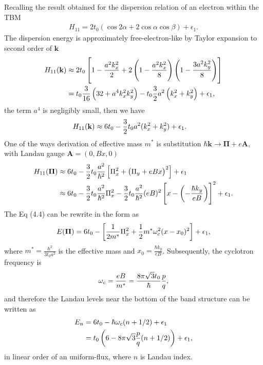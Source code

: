Recalling the result obtained for the dispersion relation of an electron within the \ac{TBM}
\begin{gather}
H_{11} = 2 t_{0} (\cos 2\alpha + 2 \cos \alpha \cos \beta) + \epsilon_{1}.
\end{gather}
The dispersion energy is approximately free-electron-like by Taylor expansion to second order of $\mathbf{k}$
\begin{equation}
\begin{aligned}
	H_{11}(\mathbf{k})
	& \approx 2 t_{0} \left[1 - \frac{a^{2} k_{x}^{2}}{2} + 2\left(1 - \dfrac{a^{2} k_{x}^{2}}{8}\right)\left(1 - \dfrac{3a^{2} k_{y}^{2}}{8}\right)\right] \\
	& = t_{0} \dfrac{3}{16} \left(32 + a^{4} k_{x}^{2} k_{y}^{2}\right) - t_{0} \dfrac{3}{2} a^{2}\left(k_{x}^{2} + k_{y}^{2}\right) + \epsilon_{1} ,
\end{aligned}
\end{equation}
the term $a^{4}$ is negligibly small, then we have
\begin{equation}
\begin{aligned}
	H_{11}(\mathbf{k})
	& \approx 6 t_{0} - \dfrac{3}{2} t_{0} a^{2} (k_{x}^{2} + k_{y}^{2}) + \epsilon_{1}.
\end{aligned}
\end{equation}
One of the ways derivation of effective mass $m^{*}$ is substitution $\hbar\mathbf{k} \rightarrow \mathbf{\Pi} + e \mathbf{A}$, with Landau gauge $\mathbf{A} = (0,Bx,0)$
\begin{equation}
\begin{aligned}
	H_{11}(\mathbf{\Pi})
	& \approx 6 t_{0} - \dfrac{3}{2} t_{0} \dfrac{a^{2}}{\hbar^{2}} \left[ \Pi_{x}^{2} + \left(\Pi_{y} + e B x\right)^{2}\right] + \epsilon_{1}                                                           \\
	& \approx 6 t_{0} - \dfrac{3}{2} t_{0} \dfrac{a^{2}}{\hbar^{2}} \Pi_{x}^{2} - \dfrac{3}{2} t_{0} \dfrac{a^{2}}{\hbar^{2}} (e B)^{2} \left[ x - \left(- \dfrac{\hbar k_{y}}{eB}\right) \right]^{2} + \epsilon_{1}.
\end{aligned}
\end{equation}
The Eq (4.4) can be rewrite in the form as
\begin{gather}
E(\mathbf{\Pi}) = 6 t_{0} - \left[\dfrac{1}{2m^{*}} \Pi_{x}^{2} + \dfrac{1}{2} m^{*} \omega_{c}^{2}(x - x_{0})^{2}\right] + \epsilon_{1},
\end{gather}
where $m^{*} = \frac{\hbar^{2}}{3t_{0}a^{2}}$ is the effective mass and $x_{0} = \frac{\hbar k_{y}}{eB}$. Subsequently, the cyclotron frequency is
\begin{gather}
\omega_{c} = \dfrac{eB}{m^{*}} = \dfrac{8 \pi \sqrt{3} t_{0}}{\hbar}  \dfrac{p}{q},
\end{gather}
and therefore the Landau levels near the bottom of the band structure can be written as
\begin{equation}
\begin{aligned}
	E_{n}
	& = 6 t_{0} - \hbar \omega_{c} (n + 1 /2) + \epsilon_{1}                    \\
	& = t_{0} \left(6 - 8\pi\sqrt{3} \dfrac{p}{q}( n + 1 /2)\right) + \epsilon_{1},
\end{aligned}
\end{equation}
in linear order of an uniform-flux, where $n$ is Landau index. 

